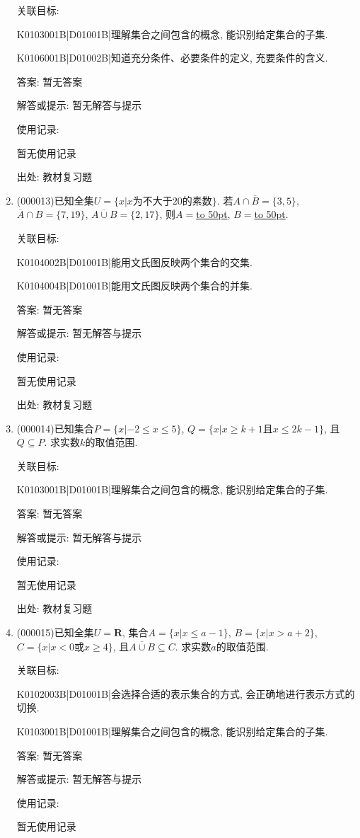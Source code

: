 \documentclass[10pt,a4paper]{article}
\newcommand{\blank}[1]{\underline{\hbox to #1pt{}}}
\begin{document}
\begin{enumerate}[1.]
关联目标:

K0103001B|D01001B|理解集合之间包含的概念, 能识别给定集合的子集.

K0106001B|D01002B|知道充分条件、必要条件的定义, 充要条件的含义.

答案: 暂无答案

解答或提示: 暂无解答与提示

使用记录:

暂无使用记录


出处: 教材复习题
\item { (000013)}已知全集$U=\{x|x\text{为不大于}20\text{的素数}\}$. 若$A\cap \overline{B}=\{3, 5\}$, $\overline{A}\cap B=\{7, 19\}$, $\overline{A\cup B}=\{2, 17\}$, 则$A=$\blank{50}, $B=$\blank{50}.


关联目标:

K0104002B|D01001B|能用文氏图反映两个集合的交集.

K0104004B|D01001B|能用文氏图反映两个集合的并集.

答案: 暂无答案

解答或提示: 暂无解答与提示

使用记录:

暂无使用记录


出处: 教材复习题
\item { (000014)}已知集合$P=\{x|-2\le x\le 5\}$, $Q=\{x|x\ge k+1\text{且}x\le 2k-1\}$, 且$Q\subseteq P$. 求实数$k$的取值范围.


关联目标:

K0103001B|D01001B|理解集合之间包含的概念, 能识别给定集合的子集.

答案: 暂无答案

解答或提示: 暂无解答与提示

使用记录:

暂无使用记录


出处: 教材复习题
\item { (000015)}已知全集$U=\mathbf{R}$, 集合$A=\{x|x\le a-1\}$, $B=\{x|x>a+2\}$, $C=\{x|x<0\text{或}x\ge 4\}$, 且$\overline{A\cup B}\subseteq C$. 求实数$a$的取值范围.


关联目标:

K0102003B|D01001B|会选择合适的表示集合的方式, 会正确地进行表示方式的切换.

K0103001B|D01001B|理解集合之间包含的概念, 能识别给定集合的子集.

答案: 暂无答案

解答或提示: 暂无解答与提示

使用记录:

暂无使用记录



\end{enumerate}
\end{document}
